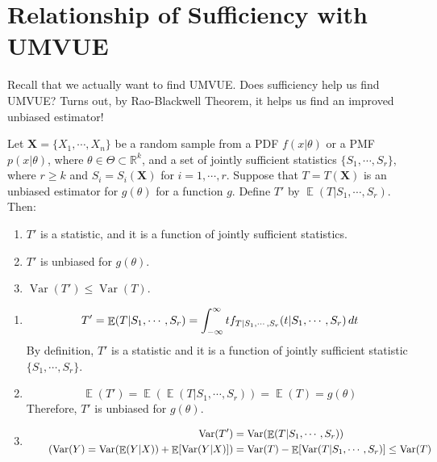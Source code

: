 \documentclass{huhtakm-template-book-v2}
\DeclareMathOperator{\E}{\mathbb{E}}
\DeclareMathOperator{\Var}{Var}
\begin{document}
\section{Relationship of Sufficiency with UMVUE}
Recall that we actually want to find UMVUE. Does sufficiency help us find UMVUE? Turns out, by Rao-Blackwell Theorem, it helps us find an improved unbiased estimator!
\begin{thm}
	Let $\mathbf{X}=\{X_{1},\cdots,X_{n}\}$ be a random sample from a PDF $f(x|\theta)$ or a PMF $p(x|\theta)$, where $\theta\in\Theta\subset\mathbb{R}^{k}$, and a set of jointly sufficient statistics $\{S_{1},\cdots,S_{r}\}$, where $r\geq k$ and $S_{i}=S_{i}(\mathbf{X})$ for $i=1,\cdots,r$. Suppose that $T=T(\mathbf{X})$ is an unbiased estimator for $g(\theta)$ for a function $g$. Define $T'$ by $\E(T|S_{1},\cdots,S_{r})$. Then:
	\begin{enumerate}
		\item $T'$ is a statistic, and it is a function of jointly sufficient statistics.
		\item $T'$ is unbiased for $g(\theta)$.
		\item $\Var(T')\leq\Var(T)$.
	\end{enumerate}
\end{thm}
\begin{proofing}
	\begin{enumerate}
		\item 
		\begin{equation*}
			T'=\E(T|S_{1},\cdots,S_{r})=\intinfty tf_{T|S_{1},\cdots,S_{r}}(t|S_{1},\cdots,S_{r})\,dt
		\end{equation*}
		By definition, $T'$ is a statistic and it is a function of jointly sufficient statistic $\{S_{1},\cdots,S_{r}\}$.
		\item 
		\begin{equation*}
			\E(T')=\E(\E(T|S_{1},\cdots,S_{r}))=\E(T)=g(\theta)
		\end{equation*}
		Therefore, $T'$ is unbiased for $g(\theta)$.
		\item 
		\begin{align*}
			\Var(T')&=\Var(\E(T|S_{1},\cdots,S_{r}))\\
			\tag{$\Var(Y)=\Var(\E(Y|X))+\E[\Var(Y|X)]$}
			&=\Var(T)-\E[\Var(T|S_{1},\cdots,S_{r})]\leq\Var(T)
		\end{align*}
	\end{enumerate}
\end{proofing}
\end{document}
